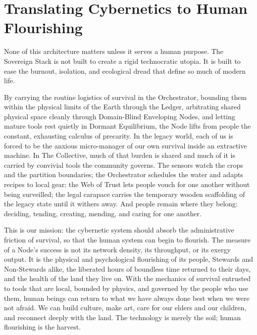 \section{Translating Cybernetics to Human Flourishing}

None of this architecture matters unless it serves a human purpose. The Sovereign Stack is not built to create a rigid technocratic utopia. It is built to ease the burnout, isolation, and ecological dread that define so much of modern life.

By carrying the routine logistics of survival in the Orchestrator, bounding them within the physical limits of the Earth through the Ledger, arbitrating shared physical space cleanly through Domain-Blind Enveloping Nodes, and letting mature tools rest quietly in Dormant Equilibrium, the Node lifts from people the constant, exhausting calculus of precarity. In the legacy world, each of us is forced to be the anxious micro-manager of our own survival inside an extractive machine. In The Collective, much of that burden is shared and much of it is carried by convivial tools the community governs. The sensors watch the crops and the partition boundaries; the Orchestrator schedules the water and adapts recipes to local gear; the Web of Trust lets people vouch for one another without being surveilled; the legal carapace carries the temporary wooden scaffolding of the legacy state until it withers away. And people remain where they belong: deciding, tending, creating, mending, and caring for one another.

This is our mission: the cybernetic system should absorb the administrative friction of survival, so that the human system can begin to flourish. The measure of a Node's success is not its network density, its throughput, or its exergy output. It is the physical and psychological flourishing of its people, Stewards and Non-Stewards alike, the liberated hours of boundless time returned to their days, and the health of the land they live on. With the mechanics of survival entrusted to tools that are local, bounded by physics, and governed by the people who use them, human beings can return to what we have always done best when we were not afraid. We can build culture, make art, care for our elders and our children, and reconnect deeply with the land. The technology is merely the soil; human flourishing is the harvest.
